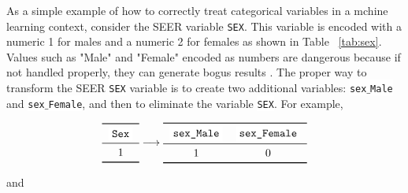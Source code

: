 \documentclass[a4paper,11pt]{article}
\newcommand{\codewhite}[1]{\colorbox{white}{\texttt{#1}}}
\begin{document}
As a simple example of how to correctly treat categorical variables in a mchine learning context, consider the SEER variable \codewhite{SEX}. This variable is encoded with a numeric 1 for males and a numeric 2 for females as shown in Table ~\ref{tab:sex}. Values such as "Male" and "Female" encoded as numbers are dangerous because if not handled properly, they can generate bogus results \cite{downey}. The proper way to transform the SEER \codewhite{SEX} variable is to create two additional variables: \codewhite{sex$\_$Male} and \codewhite{sex$\_$Female}, and then to eliminate the variable \codewhite{SEX}. For example,





\begin{equation}
\begin{tabular}{c}
\toprule
\codewhite{Sex} \\
\midrule
1 \\
\bottomrule
\end{tabular}
\longrightarrow
\begin{tabular}{cc}
\toprule
\codewhite{sex\_Male} & \codewhite{sex\_Female} \\
\midrule 
1 &  0 \\
\bottomrule
\end{tabular}
\label{eqn:onehotmale}
\end{equation}

and 
\end{document}
